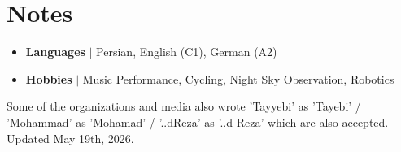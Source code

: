 \documentclass[9pt,a4paper]{article}
\newlength{\ListLeftMargin}   \setlength{\ListLeftMargin}{0.15in}
\newcommand{\deemph}[1]{{\color{gray}#1}}
\begin{document}
\section{Notes}
\begin{itemize}[leftmargin=\ListLeftMargin, label={}]
  \item \textbf{Languages} $|$ Persian, English (C1), German (A2)
  \item \textbf{Hobbies} $|$ Music Performance, Cycling, Night Sky Observation, Robotics
\end{itemize}

\vfill
\begin{center}
  \tiny
  \deemph{Some of the organizations and media also wrote 'Tayyebi' as 'Tayebi' / 'Mohammad' as 'Mohamad' / '..dReza' as '..d Reza' which are also accepted.} \\
  \deemph{Updated May 19th, 2026.}
\end{center}
\end{document}
